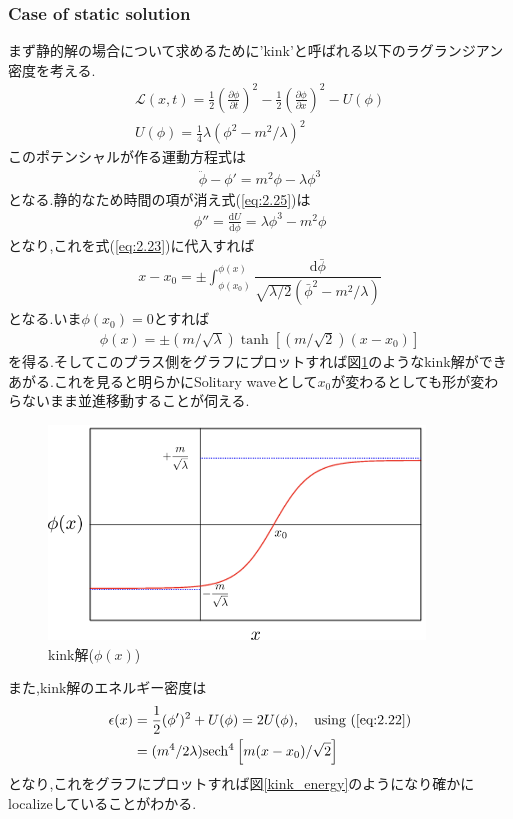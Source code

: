 \documentclass[dvipdfmx,11pt,a4paper,oneside,openany]{jsbook}
\begin{document}
\subsubsection{Case of static solution}
まず静的解の場合について求めるために'kink'と呼ばれる以下のラグランジアン密度を考える.
\begin{align}
    \mathscr{L}(x, t)=\frac{1}{2}\left(\frac{\partial \phi}{\partial t}\right)^{2}-\frac{1}{2}\left(\frac{\partial \phi}{\partial x}\right)^{2}-U(\phi)\nonumber \\
    U(\phi)=\frac{1}{4}\lambda(\phi^2-m^2/\lambda)^2\label{eq:2.24}
\end{align}
このポテンシャルが作る運動方程式は
\begin{align}
    \ddot{\phi}-\phi'=m^2\phi-\lambda\phi^3\label{eq:2.25}
\end{align}
となる.静的なため時間の項が消え式(\ref{eq:2.25})は
\begin{align}
    \phi''=\frac{\mathrm{d}U}{\mathrm{d}\phi}=\lambda\phi^3-m^2\phi
\end{align}
となり,これを式(\ref{eq:2.23})に代入すれば
\begin{align}
    x-x_{0}=\pm \int_{\phi(x_0)}^{\phi(x)}\dfrac{\mathrm{d}\bar{\phi}}{\sqrt{\lambda/2}(\bar{\phi}^2-m^2/\lambda)}
\end{align}
となる.いま$\phi(x_0)=0$とすれば
\begin{align}
    \phi(x)=\pm(m/\sqrt{\lambda})\tanh\left[(m/\sqrt{2})(x-x_0)\right]\label{eq:2.28}
\end{align}
を得る.そしてこのプラス側をグラフにプロットすれば図\ref{kink_phi}のようなkink解ができあがる.これを見ると明らかにSolitary waveとして$x_0$が変わるとしても形が変わらないまま並進移動することが伺える.
\begin{figure}[H]
    \centering
    \includegraphics[width=10cm]{figure/kink_phi.png}
    \caption{kink解($\phi(x)$)}
    \label{kink_phi}
\end{figure}
また,kink解のエネルギー密度は
\begin{align}
    \epsilon(x) & =\frac{1}{2}(\phi')^2+U(\phi)=2U(\phi),\quad \text{using (\ref{eq:2.22})} \\
                & =(m^4/2\lambda)\mathrm{sech^4}\left[m(x-x_0)/\sqrt{2}\right]
\end{align}
となり,これをグラフにプロットすれば図\ref{kink_energy}のようになり確かにlocalizeしていることがわかる.
\end{document}
